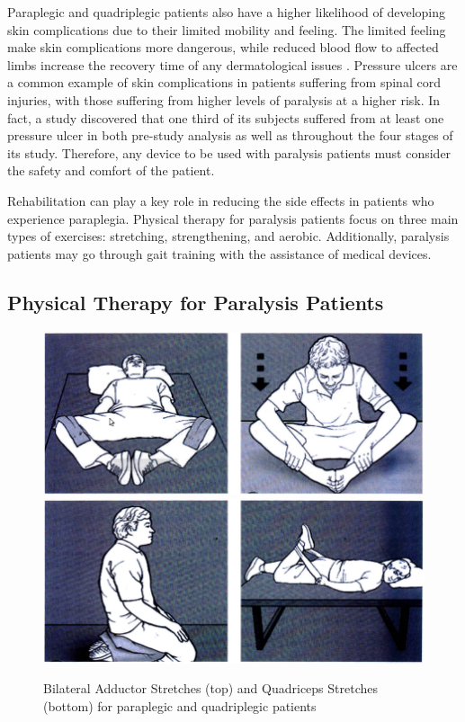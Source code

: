 Paraplegic and quadriplegic patients also have a higher likelihood of developing skin complications due to their limited mobility and feeling. The limited feeling make skin complications more dangerous, while reduced blood flow to affected limbs increase the recovery time of any dermatological issues \cite{SPISecondaryEffects}. Pressure ulcers are a common example of skin complications in patients suffering from spinal cord injuries, with those suffering from higher levels of paralysis at a higher risk. In fact, a study \cite{PressureUlcerRiskParalysis} discovered that one third of its subjects suffered from at least one pressure ulcer in both pre-study analysis as well as throughout the four stages of its study. Therefore, any device to be used with paralysis patients must consider the safety and comfort of the patient.

Rehabilitation can play a key role in reducing the side effects in patients who experience paraplegia. Physical therapy for paralysis patients focus on three main types of exercises: stretching, strengthening, and aerobic. Additionally, paralysis patients may go through gait training with the assistance of medical devices.

\subsection{Physical Therapy for Paralysis Patients}

\begin{figure}[ht!]
    \includegraphics[width=\linewidth]{Figures/Background/BilateralAdductorStretch.png}
    \includegraphics[width=\linewidth]{Figures/Background/QuadricepsStretch.png}
    \caption{Bilateral Adductor Stretches (top) and Quadriceps Stretches (bottom) for paraplegic and quadriplegic patients \cite{RehabParaplegia}}
    \label{fig:ParaplegiaStretches}
\end{figure}

